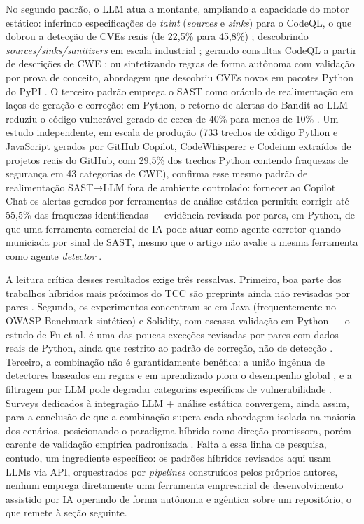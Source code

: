 No segundo padrão, o LLM atua a montante, ampliando a capacidade do motor estático: inferindo especificações de \textit{taint} (\textit{sources} e \textit{sinks}) para o CodeQL, o que dobrou a detecção de CVEs reais (de 22,5\% para 45,8\%) \cite{Li2025IRIS}; descobrindo \textit{sources/sinks/sanitizers} em escala industrial \cite{Luo2025SASTLLMDFA}; gerando consultas CodeQL a partir de descrições de CWE \cite{Wang2026CQLLM}; ou sintetizando regras de forma autônoma com validação por prova de conceito, abordagem que descobriu CVEs novos em pacotes Python do PyPI \cite{Tsigkourakos2026QRS}. O terceiro padrão emprega o SAST como oráculo de realimentação em laços de geração e correção: em Python, o retorno de alertas do Bandit ao LLM reduziu o código vulnerável gerado de cerca de 40\% para menos de 10\% \cite{Alrashedy2025FDSP, Lee2026CodeEnhancer}. Um estudo independente, em escala de produção (733 trechos de código Python e JavaScript gerados por GitHub Copilot, CodeWhisperer e Codeium extraídos de projetos reais do GitHub, com 29,5\% dos trechos Python contendo fraquezas de segurança em 43 categorias de CWE), confirma esse mesmo padrão de realimentação SAST→LLM fora de ambiente controlado: fornecer ao Copilot Chat os alertas gerados por ferramentas de análise estática permitiu corrigir até 55,5\% das fraquezas identificadas — evidência revisada por pares, em Python, de que uma ferramenta comercial de IA pode atuar como agente corretor quando municiada por sinal de SAST, mesmo que o artigo não avalie a mesma ferramenta como agente \textit{detector} \cite{Fu2025CopilotSecurity}.

A leitura crítica desses resultados exige três ressalvas. Primeiro, boa parte dos trabalhos híbridos mais próximos do TCC são preprints ainda não revisados por pares \cite{Ameen2026QASecClaw, Iranmanesh2025ZeroFalse, Agrawal2025SASTGenius, Tsigkourakos2026QRS}. Segundo, os experimentos concentram-se em Java (frequentemente no OWASP Benchmark sintético) e Solidity, com escassa validação em Python \cite{Ciavatta2026LLMSAST, Ameen2026QASecClaw, Li2025SASTReportsLLM} — o estudo de Fu et al. é uma das poucas exceções revisadas por pares com dados reais de Python, ainda que restrito ao padrão de correção, não de detecção \cite{Fu2025CopilotSecurity}. Terceiro, a combinação não é garantidamente benéfica: a união ingênua de detectores baseados em regras e em aprendizado piora o desempenho global \cite{Croft2021RuleLearningSAST}, e a filtragem por LLM pode degradar categorias específicas de vulnerabilidade \cite{Ciavatta2026LLMSAST, Ameen2026QASecClaw}. Surveys dedicados à integração LLM + análise estática convergem, ainda assim, para a conclusão de que a combinação supera cada abordagem isolada na maioria dos cenários, posicionando o paradigma híbrido como direção promissora, porém carente de validação empírica padronizada \cite{Jin2025LLMSASTSurvey, Khare2025LLMEffectiveness}. Falta a essa linha de pesquisa, contudo, um ingrediente específico: os padrões híbridos revisados aqui usam LLMs via API, orquestrados por \textit{pipelines} construídos pelos próprios autores, nenhum emprega diretamente uma ferramenta empresarial de desenvolvimento assistido por IA operando de forma autônoma e agêntica sobre um repositório, o que remete à seção seguinte.


